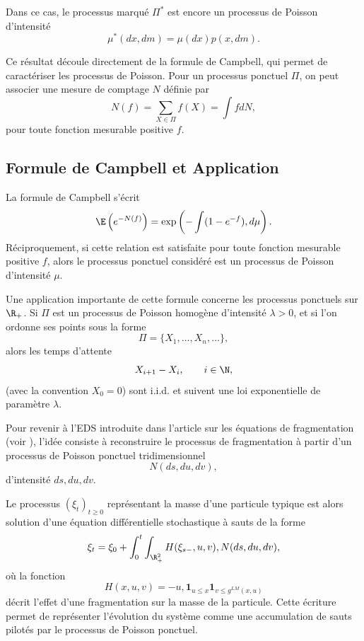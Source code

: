 \begin{important}
	Dans ce cas, le processus marqué $\Pi^*$ est encore un processus de Poisson d'intensité
	\[
		\mu^*(dx,dm)=\mu(dx)p(x,dm).
	\]
\end{important}

Ce résultat découle directement de la formule de Campbell, qui permet de caractériser les processus de Poisson. Pour un processus ponctuel $\Pi$, on peut associer une mesure de comptage $N$ définie par
\[
	N(f)=\sum_{X\in\Pi} f(X)=\int fdN,
\]
pour toute fonction mesurable positive $f$.

\subsection{Formule de Campbell et Application}

\begin{important}
	La formule de Campbell s'écrit
	\[
		\E\left(e^{-N(f)}\right)
		=
		\exp\left(
		-\int (1-e^{-f}),d\mu
		\right).
	\]
	Réciproquement, si cette relation est satisfaite pour toute fonction mesurable positive $f$, alors le processus ponctuel considéré est un processus de Poisson d'intensité $\mu$.
\end{important}

Une application importante de cette formule concerne les processus ponctuels sur $\R_+$. Si $\Pi$ est un processus de Poisson homogène d'intensité $\lambda>0$, et si l'on ordonne ses points sous la forme
\[
	\Pi=\{X_1,\dots,X_n,\dots\},
\]
alors les temps d'attente
\[
	X_{i+1}-X_i,
	\qquad i\in\N,
\]
(avec la convention $X_0=0$) sont i.i.d. et suivent une loi exponentielle de paramètre $\lambda$.

Pour revenir à l'EDS introduite dans l'article sur les équations de fragmentation (voir \cite{frag_deaconu}), l'idée consiste à reconstruire le processus de fragmentation à partir d'un processus de Poisson ponctuel tridimensionnel
\[
	N(ds,du,dv),
\]
d'intensité $ds,du,dv$.

\begin{important}
	Le processus $(\xi_t)_{t\geq0}$ représentant la masse d'une particule typique est alors solution d'une équation différentielle stochastique à sauts de la forme
	\[
		\xi_t =
		\xi_0
		+
		\int_0^t\int_{\R_+^2}
		H(\xi_{s-},u,v),N(ds,du,dv),
	\]
	où la fonction
	\[
		H(x,u,v) =
		-u,\mathbf 1_{{u\le x}}\mathbf 1_{{v\le g^{LM}(x,u)}}
	\]
	décrit l'effet d'une fragmentation sur la masse de la particule. Cette écriture permet de représenter l'évolution du système comme une accumulation de sauts pilotés par le processus de Poisson ponctuel.
\end{important}

